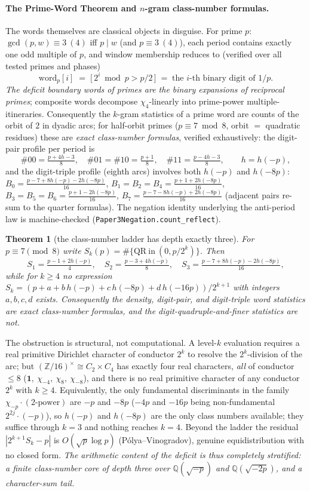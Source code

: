 \documentclass[11pt]{article}
\newtheorem{theorem}{Theorem}
\theoremstyle{remark}\newtheorem{remark}[theorem]{Remark}
\begin{document}
\paragraph{The Prime-Word Theorem and $n$-gram class-number formulas.} The words themselves are
classical objects in disguise. For prime $p$: $\gcd(p,w)\equiv3\ (4)$ iff $p\mid w$ (and $p\equiv3\
(4)$), each period contains exactly one odd multiple of $p$, and window membership reduces to
(verified over all tested primes and phases)
\[
   \mathrm{word}_p[i]\;=\;\big[\,2^i\bmod p>p/2\,\big]
   \;=\;\text{the $i$-th binary digit of }1/p .
\]
\emph{The deficit boundary words of primes are the binary expansions of reciprocal primes}; composite
words decompose $\chi_4$-linearly into prime-power multiple-itineraries. Consequently the $k$-gram
statistics of a prime word are counts of the orbit of $2$ in dyadic arcs; for half-orbit primes
($p\equiv7\bmod8$, orbit $=$ quadratic residues) these are \emph{exact class-number formulas},
verified exhaustively: the digit-pair profile per period is
\[
   \#00=\tfrac{p+4h-3}{8},\quad \#01=\#10=\tfrac{p+1}{8},\quad \#11=\tfrac{p-4h-3}{8},
   \qquad h=h(-p),
\]
and the digit-triple profile (eighth arcs) involves both $h(-p)$ and $h(-8p)$:
$B_0=\tfrac{p-7+8h(-p)-2h(-8p)}{16}$, $B_1=B_2=B_4=\tfrac{p+1+2h(-8p)}{16}$,
$B_3=B_5=B_6=\tfrac{p+1-2h(-8p)}{16}$, $B_7=\tfrac{p-7-8h(-p)+2h(-8p)}{16}$ (adjacent pairs re-sum
to the quarter formulas). The negation identity underlying the anti-period law is machine-checked
(\texttt{Paper3Negation.count\_reflect}).

\begin{theorem}[the class-number ladder has depth exactly three]\label{thm:ladder}
For $p\equiv7\pmod 8$ write $S_k(p)=\#\{\mathrm{QR}\ \mathrm{in}\ (0,p/2^k)\}$. Then
\[
   S_1=\tfrac{p-1+2h(-p)}{4},\quad S_2=\tfrac{p-3+4h(-p)}{8},\quad
   S_3=\tfrac{p-7+8h(-p)-2h(-8p)}{16},
\]
while for $k\ge4$ no expression $S_k=(p+a+b\,h(-p)+c\,h(-8p)+d\,h(-16p))/2^{k+1}$ with integers
$a,b,c,d$ exists. Consequently the density, digit-pair, and digit-triple word statistics are exact
class-number formulas, and the digit-quadruple-and-finer statistics are not.
\end{theorem}
\noindent The obstruction is structural, not computational. A level-$k$ evaluation requires a real
primitive Dirichlet character of conductor $2^k$ to resolve the $2^k$-division of the arc; but
$(\mathbb Z/16)^\times\cong C_2\times C_4$ has exactly four real characters, \emph{all} of conductor
$\le 8$ ($\mathbf 1,\ \chi_{-4},\ \chi_8,\ \chi_{-8}$), and there is no real primitive character of
any conductor $2^k$ with $k\ge4$. Equivalently, the only fundamental discriminants in the family
$\chi_{-p}\cdot(\text{$2$-power})$ are $-p$ and $-8p$ ($-4p$ and $-16p$ being non-fundamental
$2^{2j}\cdot(-p)$), so $h(-p)$ and $h(-8p)$ are the only class numbers available; they suffice through
$k=3$ and nothing reaches $k=4$. Beyond the ladder the residual $|2^{k+1}S_k-p|$ is
$O(\sqrt p\log p)$ (Pólya--Vinogradov), genuine equidistribution with no closed form.
\emph{The arithmetic content of the deficit is thus completely stratified: a finite class-number core
of depth three over $\mathbb Q(\sqrt{-p})$ and $\mathbb Q(\sqrt{-2p})$, and a character-sum tail.}
\end{document}
